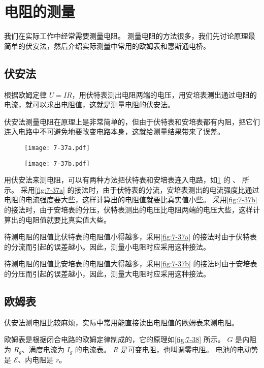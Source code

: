 \section{电阻的测量}
我们在实际工作中经常需要测量电阻。
测量电阻的方法很多，我们先讨论原理最简单的伏安法，然后介绍实际测量中常用的欧姆表和惠斯通电桥。

\subsection{伏安法}
根据欧姆定律 $U=IR$，用伏特表测出电阻两端的电压，用安培表测出通过电阻的电流，就可以求出电阻值，这就是测量电阻的伏安法。

伏安法测量电阻在原理上是非常简单的，但由于伏特表和安培表都有内阻，把它们连入电路中不可避免地要改变电路本身，这就给测量结果带来了误差。
\begin{figure}
  \begin{minipage}{0.45\linewidth}\centering
    \texttt{[image: 7-37a.pdf]}
    \subcaption{}\label{fig:7-37a}
  \end{minipage}
  \begin{minipage}{0.45\linewidth}\centering
    \texttt{[image: 7-37b.pdf]}
    \subcaption{}\label{fig:7-37b}
  \end{minipage}
  \caption{}\label{fig:7-37}
\end{figure}

用伏安法来测电阻，可以有两种方法把伏特表和安培表连入电路，如\cref{fig:7-37} 的 、 所示。
采用\cref{fig:7-37a} 的接法时，由于伏特表的分流，安培表测出的电流强度比通过电阻的电流强度要大些，这样计算出的电阻值就要比真实值小些。
采用\cref{fig:7-37b} 的接法时，由于安培表的分压，伏特表测出的电压比电阻两端的电压大些，这样计算出的电阻值就要比真实值大些。

待测电阻的阻值比伏特表的电阻值小得越多，采用\cref{fig:7-37a} 的接法时由于伏特表的分流而引起的误差越小。因此，测量小电阻时应采用这种接法。

待测电阻的阻值比安培表的电阻值大得越多，采用\cref{fig:7-37b} 的接法时由于安培表的分压而引起的误差越小，因此，测量大电阻时应采用这种接法。

\subsection{欧姆表}
伏安法测电阻比较麻烦，实际中常用能直接读出电阻值的欧姆表来测电阻。

欧姆表是根据闭合电路的欧姆定律制成的，它的原理如\cref{fig:7-38} 所示。
$G$ 是内阻为 $R_g$、满度电流为 $I_g$ 的电流表。
$R$ 是可变电阻，也叫调零电阻。
电池的电动势是 $\mathcal{E}$、内电阻是 $r$。

